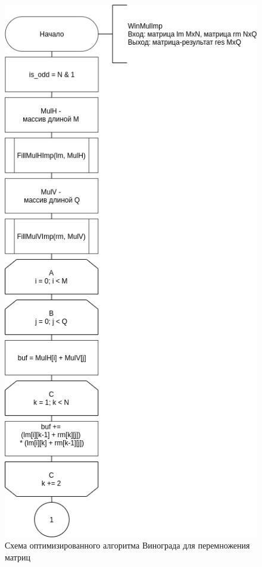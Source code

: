 \begin{figure}[h]
	\centering
	\includegraphics[scale=0.65]{schemes/win-imp-top}
	\caption{Схема оптимизированного алгоритма Винограда для перемножения матриц}
	\label{scheme:win-imp-top}
\end{figure}



